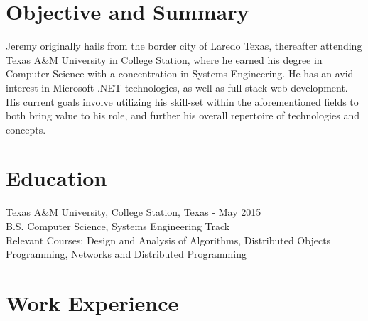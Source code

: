 \documentclass[11pt]{res} %
\begin{document}
 
 

\address{{\bf Current Address} \\   11011 Domain Drive \\   Austin, TX
         78758   \\ (956)286-8386}
\address{{\bf Contact Information} \\ jeremycantu.com \\ github.com/jac21 \\ mail@jeremycantu.com}
 
                                             
\begin{resume}
                                               
 
\section{Objective and Summary}
   Jeremy originally hails from the border city of Laredo Texas, thereafter attending Texas A\&M University in College Station, where he earned his degree in Computer Science with a concentration in Systems Engineering. He has an avid interest in Microsoft .NET technologies, as well as full-stack web development. His current goals involve utilizing his skill-set within the aforementioned fields to both bring value to his role, and further his overall repertoire of technologies and concepts.
 
\section{Education} 
 \noindent Texas A\&M University, College Station, Texas - May 2015 \\
B.S. Computer Science, Systems Engineering Track \\
Relevant Courses: Design and Analysis of Algorithms, Distributed Objects Programming, Networks and Distributed Programming
 
\section{Work Experience}


\end{resume}
\end{document}
